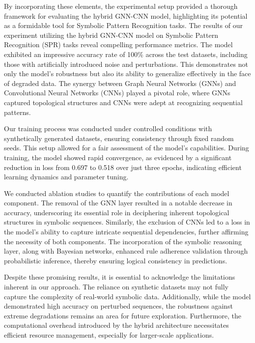 \documentclass{article}
\begin{document}
By incorporating these elements, the experimental setup provided a thorough framework for evaluating the hybrid GNN-CNN model, highlighting its potential as a formidable tool for Symbolic Pattern Recognition tasks.
The results of our experiment utilizing the hybrid GNN-CNN model on Symbolic Pattern Recognition (SPR) tasks reveal compelling performance metrics. The model exhibited an impressive accuracy rate of 100\% across the test datasets, including those with artificially introduced noise and perturbations. This demonstrates not only the model's robustness but also its ability to generalize effectively in the face of degraded data. The synergy between Graph Neural Networks (GNNs) and Convolutional Neural Networks (CNNs) played a pivotal role, where GNNs captured topological structures and CNNs were adept at recognizing sequential patterns.

Our training process was conducted under controlled conditions with synthetically generated datasets, ensuring consistency through fixed random seeds. This setup allowed for a fair assessment of the model's capabilities. During training, the model showed rapid convergence, as evidenced by a significant reduction in loss from 0.697 to 0.518 over just three epochs, indicating efficient learning dynamics and parameter tuning.

We conducted ablation studies to quantify the contributions of each model component. The removal of the GNN layer resulted in a notable decrease in accuracy, underscoring its essential role in deciphering inherent topological structures in symbolic sequences. Similarly, the exclusion of CNNs led to a loss in the model's ability to capture intricate sequential dependencies, further affirming the necessity of both components. The incorporation of the symbolic reasoning layer, along with Bayesian networks, enhanced rule adherence validation through probabilistic inference, thereby ensuring logical consistency in predictions.

Despite these promising results, it is essential to acknowledge the limitations inherent in our approach. The reliance on synthetic datasets may not fully capture the complexity of real-world symbolic data. Additionally, while the model demonstrated high accuracy on perturbed sequences, the robustness against extreme degradations remains an area for future exploration. Furthermore, the computational overhead introduced by the hybrid architecture necessitates efficient resource management, especially for larger-scale applications.
\end{document}
